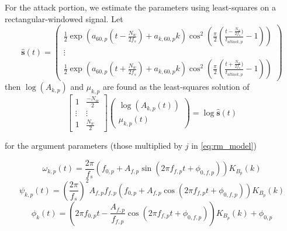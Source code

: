 \documentclass[letterpaper,12pt]{report}
\begin{document}
For the attack portion, we estimate the parameters using least-squares on a
rectangular-windowed signal. Let
\begin{equation}
    \hat{\mathbf{s}}(t) =
    \begin{pmatrix}
        \frac{1}{2} \exp(a_{60,p}(t - \frac{N_{w}}{2f_{s}}) + a_{k,60,p} k)
        \cos^{2}(\frac{\pi}{2}(\frac{t - \frac{N_{w}}{2f_{s}})}{t_{attack,p}} -
        1)) \\
        \vdots \\
        \frac{1}{2} \exp(a_{60,p}(t + \frac{N_{w}}{2f_{s}}) + a_{k,60,p} k)
        \cos^{2}(\frac{\pi}{2}(\frac{t + \frac{N_{w}}{2f_{s}})}{t_{attack,p}} -
        1))
    \end{pmatrix}
\end{equation}
then $\log(A_{k,p})$ and $\mu_{k,p}$ are found as the least-squares solution of
\begin{equation}
    \begin{bmatrix}
        1 & \frac{-N_{w}}{2} \\
        \vdots & \vdots \\
        1 & \frac{N_{w}}{2}
    \end{bmatrix}
    \begin{pmatrix}
        \log(A_{k,p}(t)) \\
        \mu_{k,p}(t)
    \end{pmatrix}
    = \log{\hat{\mathbf{s}}(t)}
\end{equation}

for the argument parameters (those multiplied by $j$ in \eqref{eq:rm_model})

\begin{equation}
    \omega_{k,p}(t) = \frac{2 \pi}{f_{s}} ( f_{0,p} + A_{f,p} \sin(2 \pi f_{f,p} t +
    \phi_{0,f,p})) K_{B_{p}}(k)
\end{equation}
\begin{equation}
    \psi_{k,p}(t) = (\frac{2 \pi}{f_{s}})^{2} A_{f,p} f_{f,p} ( f_{0,p} + A_{f,p}
    \cos(2 \pi f_{f,p} t + \phi_{0,f,p})) K_{B_{p}}(k)
\end{equation}
\begin{equation}
    \phi_{k}(t) = (2\pi f_{0,p}t - \frac{A_{f,p}}{f_{f,p}} \cos(2\pi f_{f,p} t +
    \phi_{0,f,p})) K_{B_{p}}(k) + \phi_{0,p}
\end{equation}
\end{document}
